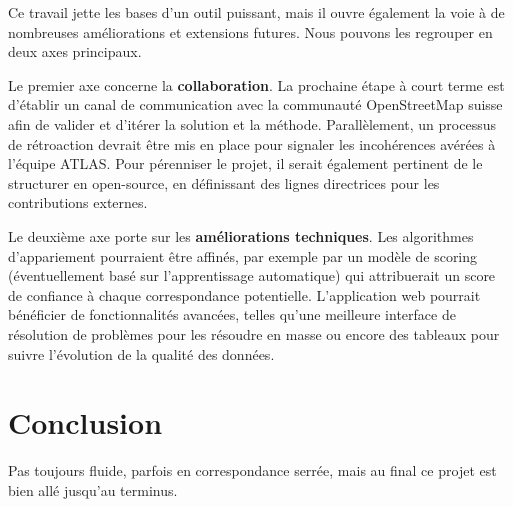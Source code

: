 Ce travail jette les bases d'un outil puissant, mais il ouvre également la voie à de nombreuses améliorations et extensions futures. Nous pouvons les regrouper en deux axes principaux.

Le premier axe concerne la \textbf{collaboration}. La prochaine étape à court terme est d'établir un canal de communication avec la communauté OpenStreetMap suisse afin de valider et d’itérer la solution et la méthode. Parallèlement, un processus de rétroaction devrait être mis en place pour signaler les incohérences avérées à l'équipe ATLAS. Pour pérenniser le projet, il serait également pertinent de le structurer en open-source, en définissant des lignes directrices pour les contributions externes.

Le deuxième axe porte sur les \textbf{améliorations techniques}. Les algorithmes d'appariement pourraient être affinés, par exemple par un modèle de scoring (éventuellement basé sur l'apprentissage automatique) qui attribuerait un score de confiance à chaque correspondance potentielle. L'application web pourrait bénéficier de fonctionnalités avancées, telles qu’une meilleure interface de résolution de problèmes pour les résoudre en masse ou encore des tableaux pour suivre l'évolution de la qualité des données.

\vspace{0.5em}
\section*{Conclusion}

\newline

Pas toujours fluide, parfois en correspondance serrée, mais au final ce projet est bien allé jusqu’au terminus.
